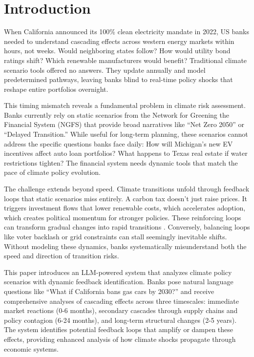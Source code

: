 \documentclass[conference]{IEEEtran}
\begin{document}
\section{Introduction}
When California announced its 100\% clean electricity mandate in 2022, US banks needed to understand cascading effects across western energy markets within hours, not weeks. Would neighboring states follow? How would utility bond ratings shift? Which renewable manufacturers would benefit? Traditional climate scenario tools offered no answers. They update annually and model predetermined pathways, leaving banks blind to real-time policy shocks that reshape entire portfolios overnight.

This timing mismatch reveals a fundamental problem in climate risk assessment. Banks currently rely on static scenarios from the Network for Greening the Financial System (NGFS) \cite{feridun2020climate} that provide broad narratives like ``Net Zero 2050'' or ``Delayed Transition.'' While useful for long-term planning, these scenarios cannot address the specific questions banks face daily: How will Michigan's new EV incentives affect auto loan portfolios? What happens to Texas real estate if water restrictions tighten? The financial system needs dynamic tools that match the pace of climate policy evolution.

The challenge extends beyond speed. Climate transitions unfold through feedback loops \cite{may1976simple} that static scenarios miss entirely. A carbon tax doesn't just raise prices. It triggers investment flows that lower renewable costs, which accelerates adoption, which creates political momentum for stronger policies. These reinforcing loops can transform gradual changes into rapid transitions \cite{scheffer2009early}. Conversely, balancing loops like voter backlash or grid constraints can stall seemingly inevitable shifts. Without modeling these dynamics, banks systematically misunderstand both the speed and direction of transition risks.

This paper introduces an LLM-powered system that analyzes climate policy scenarios with dynamic feedback identification. Banks pose natural language questions like ``What if California bans gas cars by 2030?'' and receive comprehensive analyses of cascading effects \cite{allen2000financial} across three timescales: immediate market reactions (0-6 months), secondary cascades through supply chains and policy contagion (6-24 months), and long-term structural changes (2-5 years). The system identifies potential feedback loops that amplify or dampen these effects, providing enhanced analysis of how climate shocks propagate through economic systems.
\end{document}
